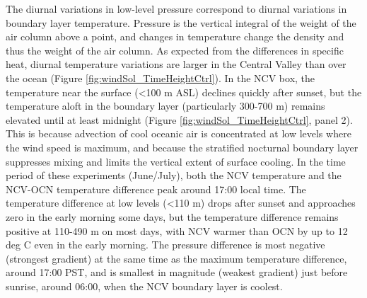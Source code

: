 The diurnal variations in low-level pressure correspond to diurnal variations in boundary layer temperature.  Pressure is the vertical integral of the weight of the air column above a point, and changes in temperature change the density and thus the weight of the air column.  As expected from the differences in specific heat, diurnal temperature variations are larger in the Central Valley than over the ocean (Figure \ref{fig:windSol_TimeHeightCtrl}).  In the NCV box, the temperature near the surface (\textless 100 m ASL) declines quickly after sunset, but the temperature aloft in the boundary layer (particularly 300-700 m) remains elevated until at least midnight (Figure \ref{fig:windSol_TimeHeightCtrl}, panel 2).  This is because advection of cool oceanic air is concentrated at low levels where the wind speed is maximum, and because the stratified nocturnal boundary layer suppresses mixing and limits the vertical extent of surface cooling.  In the time period of these experiments (June/July), both the NCV temperature and the NCV-OCN temperature difference peak around 17:00 local time.  The temperature difference at low levels (\textless 110 m) drops after sunset and approaches zero in the early morning some days, but the temperature difference remains positive at 110-490 m on most days, with NCV warmer than OCN by up to 12 deg C even in the early morning.  The pressure difference is most negative (strongest gradient) at the same time as the maximum temperature difference, around 17:00 PST, and is smallest in magnitude (weakest gradient) just before sunrise, around 06:00, when the NCV boundary layer is coolest.  

